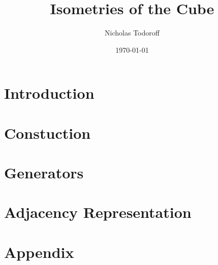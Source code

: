 \documentclass[12pt]{article}
\title{\bf Isometries of the Cube}
\author{Nicholas Todoroff}
\date\today
\numberwithin{section}{part}
\numberwithin{equation}{section}
\begin{document}
\maketitle

\part*{Introduction}
                           
\part{Constuction}
  \label{part:construction}
\part{Generators}
  \label{part:generators}  
\part{Adjacency Representation}
  \label{part:adjrep}      

\newpage
\part*{Appendix}
                           
\end{document}

